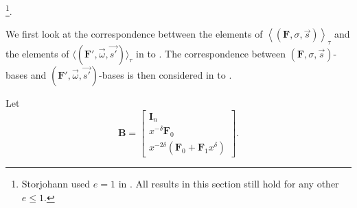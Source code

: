 \footnote{Storjohann used $e=1$ in \citep{Storjohann:2006}. All results in
this section still hold for any other $e\le1.$%
}. %
\begin{comment}
In fact, it is quite easy to construct a $(\check{\mathbf{F}},\vec{\omega},\vec{s'})$-basis
from a $\left(\mathbf{F},\sigma,\vec{s}\right)$-basis, as we show
later in \prettyref{lem:FtoAbasis}. However, it requires more work
to extract a $\left(\mathbf{F},\sigma,\vec{s}\right)$-basis from
a $(\check{\mathbf{F}},\vec{\omega},\vec{s'})$-basis, which is addressed
eventually in \prettyref{cor:extractingFbasisFromGbasis}. Note that
although constructing a $(\check{\mathbf{F}},\vec{\omega},\vec{s'})$-basis
from a $\left(\mathbf{F},\sigma,\vec{s}\right)$-basis in \prettyref{lem:FtoAbasis}
is the reverse of what we want, this well-formed $(\check{\mathbf{F}},\vec{\omega},\vec{s'})$-basis
restricts the elements of $\langle(\check{\mathbf{F}},\vec{\omega},\vec{s'})\rangle$
to a simple form shown in \prettyref{cor:FtauBasisForm}, which helps
to establish a close correspondence between a $(\check{\mathbf{F}},\vec{\omega},\vec{s'})$-basis
and a $\left(\mathbf{F},\sigma,\vec{s}\right)$-basis in \prettyref{lem:2delta-1Basis},
\prettyref{lem:2deltaBasis}, and \prettyref{thm:mainTheorem}. 
\end{comment}
{}

We first look at the correspondence bettween the elements of $\left\langle \left(\mathbf{F},\sigma,\vec{s}\right)\right\rangle _{\tau}$
and the elements of $\langle(\mathbf{F}',\vec{\omega},\vec{s'})\rangle_{\tau}$
in  to . The
correspondence between $\left(\mathbf{F},\sigma,\vec{s}\right)$-bases
and $(\mathbf{F}',\vec{\omega},\vec{s'})$-bases is then considered
in  to .

Let \[
\mathbf{B}=\left[\begin{array}{c}
\mathbf{I}_{n}\\
x^{-\delta}\mathbf{F}_{0}\\
x^{-2\delta}\left(\mathbf{F}_{0}+\mathbf{F}_{1}x^{\delta}\right)\end{array}\right].\]

